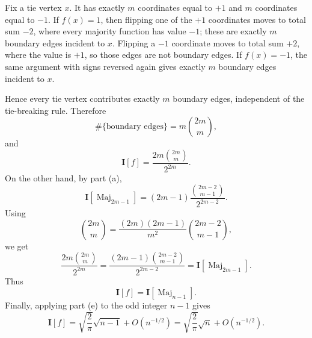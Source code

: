 \documentclass[11pt]{article}
\newcommand{\Maj}{\operatorname{Maj}}
\newcommand{\I}{\mathbf I}
\begin{document}
\begin{enumerate}[label=\textbf{(\alph*)}]
Fix a tie vertex $x$.  It has exactly $m$ coordinates equal to $+1$ and
$m$ coordinates equal to $-1$.  If $f(x)=1$, then flipping one of the
$+1$ coordinates moves to total sum $-2$, where every majority function
has value $-1$; these are exactly $m$ boundary edges incident to $x$.
Flipping a $-1$ coordinate moves to total sum $+2$, where the value is
$+1$, so those edges are not boundary edges.  If $f(x)=-1$, the same
argument with signs reversed again gives exactly $m$ boundary edges
incident to $x$.

Hence every tie vertex contributes exactly $m$ boundary edges, independent
of the tie-breaking rule.  Therefore
\[
  \#\{\text{boundary edges}\}=m\binom{2m}{m},
\]
and
\[
  \I[f]
    =
  \frac{2m\binom{2m}{m}}{2^{2m}}.
\]
On the other hand, by part (a),
\[
  \I[\Maj_{2m-1}]
    =
  (2m-1)\frac{\binom{2m-2}{m-1}}{2^{2m-2}}.
\]
Using
\[
  \binom{2m}{m}
    =
  \frac{(2m)(2m-1)}{m^2}\binom{2m-2}{m-1},
\]
we get
\[
  \frac{2m\binom{2m}{m}}{2^{2m}}
    =
  \frac{(2m-1)\binom{2m-2}{m-1}}{2^{2m-2}}
    =
  \I[\Maj_{2m-1}].
\]
Thus
\[
  \I[f]=\I[\Maj_{n-1}].
\]
Finally, applying part (e) to the odd integer $n-1$ gives
\[
  \I[f]
    =
  \sqrt{\frac{2}{\pi}}\sqrt{n-1}+O(n^{-1/2})
    =
  \sqrt{\frac{2}{\pi}}\sqrt n+O(n^{-1/2}).
\]
\end{enumerate}
\end{document}
